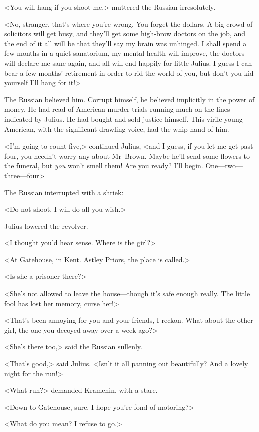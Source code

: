 <You will hang if you shoot me,> muttered the Russian irresolutely.

<No, stranger, that's where you're wrong. You forget the dollars. A big crowd of solicitors will get busy, and they'll get some high-brow doctors on the job, and the end of it all will be that they'll say my brain was unhinged. I shall spend a few months in a quiet sanatorium, my mental health will improve, the doctors will declare me sane again, and all will end happily for little Julius. I guess I can bear a few months' retirement in order to rid the world of you, but don't you kid yourself I'll hang for it!>

The Russian believed him. Corrupt himself, he believed implicitly in the power of money. He had read of American murder trials running much on the lines indicated by Julius. He had bought and sold justice himself. This virile young American, with the significant drawling voice, had the whip hand of him.

<I'm going to count five,> continued Julius, <and I guess, if you let me get past four, you needn't worry any about Mr~Brown. Maybe he'll send some flowers to the funeral, but \emph{you} won't smell them! Are you ready? I'll begin. One—two—three—four\longdash>

The Russian interrupted with a shriek:

<Do not shoot. I will do all you wish.>

Julius lowered the revolver.

<I thought you'd hear sense. Where is the girl?>

<At Gatehouse, in Kent. Astley Priors, the place is called.>

<Is she a prisoner there?>

<She's not allowed to leave the house—though it's safe enough really. The little fool has lost her memory, curse her!>

<That's been annoying for you and your friends, I reckon. What about the other girl, the one you decoyed away over a week ago?>

<She's there too,> said the Russian sullenly.

<That's good,> said Julius. <Isn't it all panning out beautifully? And a lovely night for the run!>

<What run?> demanded Kramenin, with a stare.

<Down to Gatehouse, sure. I hope you're fond of motoring?>

<What do you mean? I refuse to go.>

